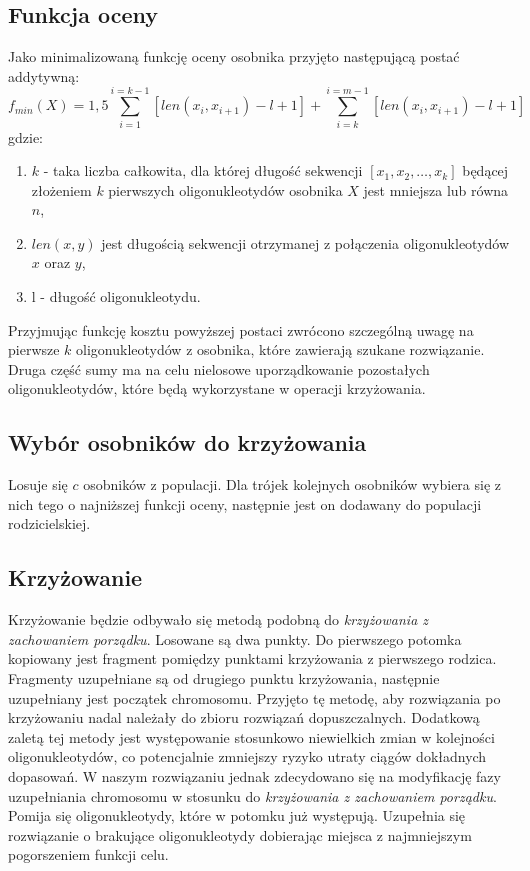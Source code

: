 \documentclass{article}
\begin{document}
\subsection{Funkcja oceny}
Jako minimalizowaną funkcję oceny osobnika przyjęto następującą postać addytywną:
\begin{equation}
	f_{min}(X) = 1,5\sum_{i = 1}^{i = k - 1}{[len(x_{i}, x_{i+1}) - l + 1]} + \sum_{i = k}^{i = m - 1}{[len(x_{i}, x_{i+1})- l + 1]}
\end{equation}
gdzie:
\begin{enumerate}
	\item $k$ - taka liczba całkowita, dla której długość sekwencji $[x_{1}, x_{2}, \ldots , x_{k}]$ będącej złożeniem $k$ pierwszych oligonukleotydów osobnika $X$ jest mniejsza lub równa $n$,
	\item $len(x, y)$ jest długością sekwencji otrzymanej z połączenia oligonukleotydów $x$ oraz $y$,
	\item l - długość oligonukleotydu.
\end{enumerate}
Przyjmując funkcję kosztu powyższej postaci zwrócono szczególną uwagę na pierwsze $k$ oligonukleotydów z osobnika, które zawierają szukane rozwiązanie. Druga część sumy ma na celu nielosowe uporządkowanie pozostałych oligonukleotydów, które będą wykorzystane w operacji krzyżowania.
\pagebreak
\subsection{Wybór osobników do krzyżowania}
Losuje się $c$ osobników z populacji.
Dla trójek kolejnych osobników wybiera się z nich tego o najniższej funkcji oceny, następnie jest on dodawany do populacji rodzicielskiej.
\subsection{Krzyżowanie}
Krzyżowanie będzie odbywało się metodą podobną do \textit{krzyżowania z zachowaniem porządku}.
Losowane są dwa punkty. Do pierwszego potomka kopiowany jest fragment pomiędzy punktami krzyżowania z pierwszego rodzica.
Fragmenty uzupełniane są od drugiego punktu krzyżowania, następnie uzupełniany jest początek chromosomu. Przyjęto tę metodę, aby rozwiązania po krzyżowaniu nadal należały do zbioru rozwiązań dopuszczalnych. Dodatkową zaletą tej metody jest występowanie stosunkowo niewielkich  zmian w kolejności oligonukleotydów, co potencjalnie zmniejszy ryzyko utraty ciągów dokładnych dopasowań. W naszym rozwiązaniu jednak zdecydowano się na modyfikację fazy uzupełniania chromosomu w stosunku do \textit{krzyżowania z zachowaniem porządku}. 
Pomija się oligonukleotydy, które w potomku już występują.
Uzupełnia się rozwiązanie o brakujące oligonukleotydy dobierając miejsca z najmniejszym pogorszeniem funkcji celu.
\end{document}

